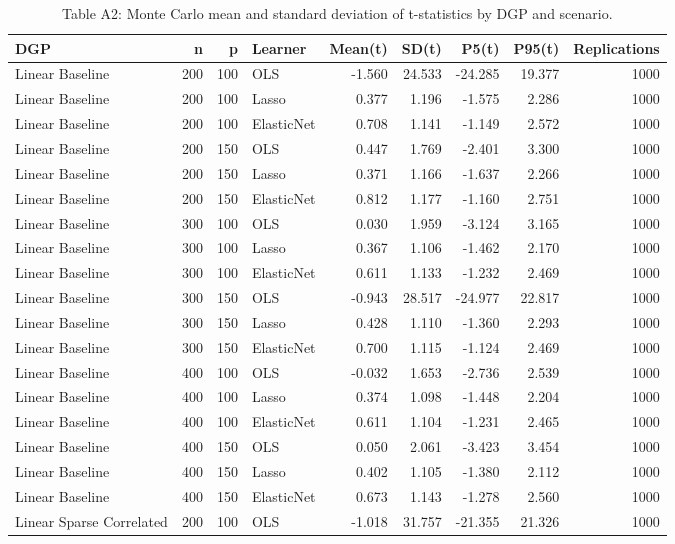 \begin{table}[!htbp]
\centering
\caption*{Table A2: Monte Carlo mean and standard deviation of t-statistics by DGP and scenario.}
\label{tab:tstat-a2}
\begin{tabular}{l r r l r r r r r}
 \hline
DGP & n & p & Learner & Mean(t) & SD(t) & P5(t) & P95(t) & Replications \\
 \hline
Linear Baseline & 200 & 100 & OLS & -1.560 & 24.533 & -24.285 & 19.377 & 1000 \\
Linear Baseline & 200 & 100 & Lasso & 0.377 & 1.196 & -1.575 & 2.286 & 1000 \\
Linear Baseline & 200 & 100 & ElasticNet & 0.708 & 1.141 & -1.149 & 2.572 & 1000 \\
Linear Baseline & 200 & 150 & OLS & 0.447 & 1.769 & -2.401 & 3.300 & 1000 \\
Linear Baseline & 200 & 150 & Lasso & 0.371 & 1.166 & -1.637 & 2.266 & 1000 \\
Linear Baseline & 200 & 150 & ElasticNet & 0.812 & 1.177 & -1.160 & 2.751 & 1000 \\
Linear Baseline & 300 & 100 & OLS & 0.030 & 1.959 & -3.124 & 3.165 & 1000 \\
Linear Baseline & 300 & 100 & Lasso & 0.367 & 1.106 & -1.462 & 2.170 & 1000 \\
Linear Baseline & 300 & 100 & ElasticNet & 0.611 & 1.133 & -1.232 & 2.469 & 1000 \\
Linear Baseline & 300 & 150 & OLS & -0.943 & 28.517 & -24.977 & 22.817 & 1000 \\
Linear Baseline & 300 & 150 & Lasso & 0.428 & 1.110 & -1.360 & 2.293 & 1000 \\
Linear Baseline & 300 & 150 & ElasticNet & 0.700 & 1.115 & -1.124 & 2.469 & 1000 \\
Linear Baseline & 400 & 100 & OLS & -0.032 & 1.653 & -2.736 & 2.539 & 1000 \\
Linear Baseline & 400 & 100 & Lasso & 0.374 & 1.098 & -1.448 & 2.204 & 1000 \\
Linear Baseline & 400 & 100 & ElasticNet & 0.611 & 1.104 & -1.231 & 2.465 & 1000 \\
Linear Baseline & 400 & 150 & OLS & 0.050 & 2.061 & -3.423 & 3.454 & 1000 \\
Linear Baseline & 400 & 150 & Lasso & 0.402 & 1.105 & -1.380 & 2.112 & 1000 \\
Linear Baseline & 400 & 150 & ElasticNet & 0.673 & 1.143 & -1.278 & 2.560 & 1000 \\
Linear Sparse Correlated & 200 & 100 & OLS & -1.018 & 31.757 & -21.355 & 21.326 & 1000 \\

\end{tabular}
\end{table}
